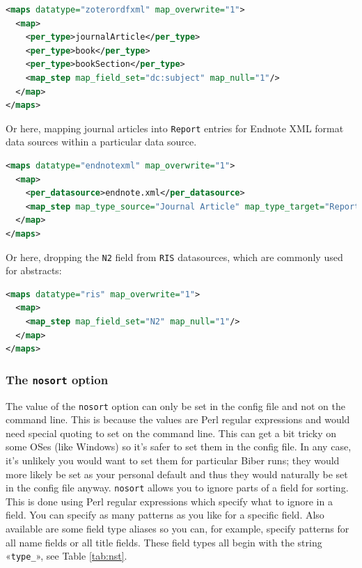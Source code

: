\documentclass{ltxdockit}
\begin{document}
\begin{lstlisting}[language=xml,escapechar=+,mathescape=true]
<maps datatype="zoterordfxml" map_overwrite="1">
  <map>
    <per_type>journalArticle</per_type>
    <per_type>book</per_type>
    <per_type>bookSection</per_type>
    <map_step map_field_set="dc:subject" map_null="1"/>
  </map>
</maps>
\end{lstlisting}

\noindent Or here, mapping journal articles into \verb+Report+ entries for
Endnote XML format data sources within a particular data source.

\begin{lstlisting}[language=xml,escapechar=+,mathescape=true]
<maps datatype="endnotexml" map_overwrite="1">
  <map>
    <per_datasource>endnote.xml</per_datasource>
    <map_step map_type_source="Journal Article" map_type_target="Report"/>
  </map>
</maps>
\end{lstlisting}

\noindent Or here, dropping the \verb+N2+ field from \verb+RIS+
datasources, which are commonly used for abstracts:

\begin{lstlisting}[language=xml,escapechar=+,mathescape=true]
<maps datatype="ris" map_overwrite="1">
  <map>
    <map_step map_field_set="N2" map_null="1"/>
  </map>
</maps>
\end{lstlisting}
\bigskip
\subsubsection{The \texttt{nosort} option}\label{nosort}

The value of the \verb+nosort+ option can only be set in the config file
and not on the command line. This is because the values are Perl regular
expressions and would need special quoting to set on the command line. This
can get a bit tricky on some OSes (like Windows) so it's safer to set them
in the config file. In any case, it's unlikely you would want to set them
for particular Biber runs; they would more likely be set as your
personal default and thus they would naturally be set in the config file
anyway. \verb+nosort+ allows you to ignore parts of a field for sorting.
This is done using Perl regular expressions which specify what to
ignore in a field. You can specify as many patterns as you like for a
specific field. Also available are some field type aliases so you can, for
example, specify patterns for all name fields or all title fields. These
field types all begin with the string «\verb+type_+», see Table
\ref{tab:nst}.
\end{document}

